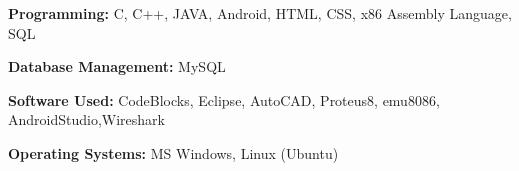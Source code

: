 \textbf{Programming: }
C, C++, JAVA, Android, HTML, CSS, x86 Assembly Language, SQL

\textbf{Database Management: }
MySQL

\textbf{Software Used: }
CodeBlocks, Eclipse, AutoCAD, Proteus8, emu8086, AndroidStudio,Wireshark

\textbf{Operating Systems: }
MS Windows, Linux (Ubuntu)